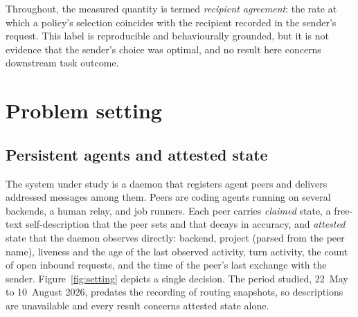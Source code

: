 \documentclass[11pt]{article}
\theoremstyle{definition}
\begin{document}
Throughout, the measured quantity is termed \emph{recipient agreement}: the rate at which a policy's selection coincides with the recipient recorded in the sender's request. This label is reproducible and behaviourally grounded, but it is not evidence that the sender's choice was optimal, and no result here concerns downstream task outcome.

\section{Problem setting}
\label{sec:setting}

\subsection{Persistent agents and attested state}

The system under study is a daemon that registers agent peers and delivers addressed messages among them. Peers are coding agents running on several backends, a human relay, and job runners. Each peer carries \emph{claimed} state, a free-text self-description that the peer sets and that decays in accuracy, and \emph{attested} state that the daemon observes directly: backend, project (parsed from the peer name), liveness and the age of the last observed activity, turn activity, the count of open inbound requests, and the time of the peer's last exchange with the sender. Figure~\ref{fig:setting} depicts a single decision. The period studied, 22~May to 10~August 2026, predates the recording of routing snapshots, so descriptions are unavailable and every result concerns attested state alone.
\end{document}
